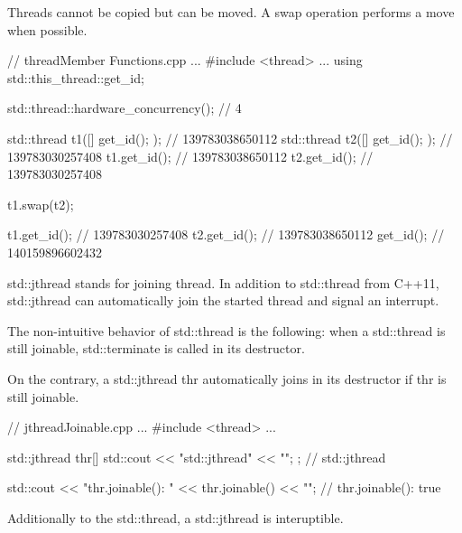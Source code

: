 Threads cannot be copied but can be moved. A swap operation performs a move when possible.


\begin{cpp}
// threadMember Functions.cpp
...
#include <thread>
...
using std::this_thread::get_id;

std::thread::hardware_concurrency(); // 4

std::thread t1([]{ get_id(); }); // 139783038650112
std::thread t2([]{ get_id(); }); // 139783030257408
t1.get_id(); // 139783038650112
t2.get_id(); // 139783030257408

t1.swap(t2);

t1.get_id(); // 139783030257408
t2.get_id(); // 139783038650112
get_id(); // 140159896602432
\end{cpp}


std::jthread stands for joining thread. In addition to std::thread from C++11, std::jthread can automatically join the started thread and signal an interrupt.


The non-intuitive behavior of std::thread is the following: when a std::thread is still joinable, std::terminate is called in its destructor.

On the contrary, a std::jthread thr automatically joins in its destructor if thr is still joinable.


\begin{cpp}
// jthreadJoinable.cpp
...
#include <thread>
...

std::jthread thr{[]{ std::cout << "std::jthread" << "\n"; }}; // std::jthread

std::cout << "thr.joinable(): " << thr.joinable() << "\n"; // thr.joinable(): true
\end{cpp}

Additionally to the std::thread, a std::jthread is interuptible.















